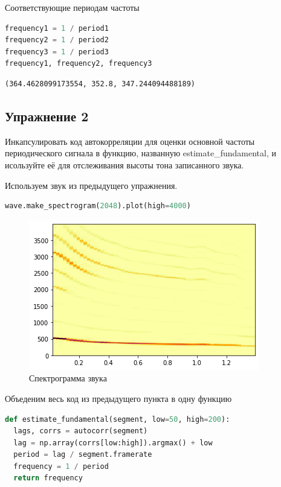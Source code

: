 Соответствующие периодам частоты

\begin{lstlisting}[language=Python]
frequency1 = 1 / period1
frequency2 = 1 / period2
frequency3 = 1 / period3
frequency1, frequency2, frequency3
\end{lstlisting}
\begin{lstlisting}
(364.4628099173554, 352.8, 347.244094488189)
\end{lstlisting}

\subsection{Упражнение 2}
Инкапсулировать код автокорреляции для оценки основной частоты периодического сигнала в функцию, названную estimate\_fundamental, и исользуйте её для отслеживания высоты тона записанного звука.

Используем звук из предыдущего упражнения.

\begin{lstlisting}[language=Python]
wave.make_spectrogram(2048).plot(high=4000)
\end{lstlisting}
\begin{figure}[H]
	\begin{center}
		\includegraphics[scale=1]{fig/lab05/lab05_3.png}
		\caption{Спектрограмма звука}
	\end{center}
\end{figure}

Объеденим весь код из предыдущего пункта в одну функцию

\begin{lstlisting}[language=Python]
def estimate_fundamental(segment, low=50, high=200):
  lags, corrs = autocorr(segment)
  lag = np.array(corrs[low:high]).argmax() + low
  period = lag / segment.framerate
  frequency = 1 / period
  return frequency
\end{lstlisting}

